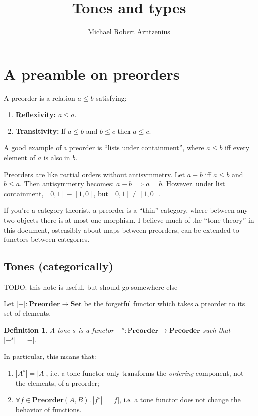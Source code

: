 \documentclass{article}
\title{Tones and types}
\author{Michael Robert Arntzenius}
\date{\todo{16 November 2017 -- ???}}
\newtheorem{definition}{Definition}
\newcommand{\todo}[1]{{\color{red}#1}}
\newcommand{\mb}[1]{\ensuremath{\mathbf{#1}}}
\newcommand{\mc}[1]{\ensuremath{\mathcal{#1}}}
\begin{document}
\maketitle

\section{A preamble on preorders}

A preorder is a relation $a \le b$ satisfying:
\begin{enumerate}
\item \textbf{Reflexivity:} $a \le a$.
\item \textbf{Transitivity:} If $a \le b$ and $b \le c$ then $a \le c$.
\end{enumerate}

A good example of a preorder is ``lists under containment'', where $a \le b$ iff
every element of $a$ is also in $b$.

Preorders are like partial orders without antisymmetry. Let $a \equiv b$ iff $a
\le b$ and $b \le a$. Then antisymmetry becomes: $a \equiv b \implies a = b$.
However, under list containment, $[0,1] \equiv [1,0]$, but $[0,1] \ne [1,0]$.

If you're a category theorist, a preorder is a ``thin'' category, where between
any two objects there is at most one morphism. I believe much of the ``tone
theory'' in this document, ostensibly about maps between preorders, can be
extended to functors between categories.


\subsection{Tones (categorically)}

\todo{TODO: this note is useful, but should go somewhere else}

\newcommand{\elemset}[1]{\ensuremath{\mc{U}({#1})}}
\newcommand{\elemsetfn}[0]{\mc{U}}
\renewcommand{\elemset}[1]{\ensuremath{|{#1}|}}
\renewcommand{\elemsetfn}[0]{\elemset{-}}

Let $\elemsetfn{} : \mb{Preorder} \to \mb{Set}$ be the forgetful functor which
takes a preorder to its set of elements.

\begin{definition}
  A tone $s$ is a functor $-^s : \mb{Preorder} \to \mb{Preorder}$ such that
  $\elemset{-^s} = \elemsetfn$.
\end{definition}

In particular, this means that:
\begin{enumerate}
\item $|A^s| = |A|$, i.e. a tone functor only transforms the \emph{ordering}
  component, not the elements, of a preorder;
\item $\forall f \in \mb{Preorder}(A, B).\ |f^s| = |f|$, i.e. a tone functor
  does not change the behavior of functions.
\end{enumerate}
\end{document}
